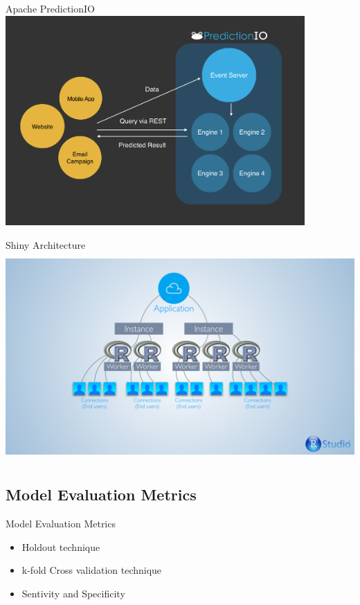 \documentclass{beamer}
\begin{document}
\begin{frame}{Apache PredictionIO}
	\includegraphics[width=\textwidth,height=8cm]{ppt_figures/predictionioeventsever.png}
\end{frame}

\begin{frame}{Shiny Architecture}
	\includegraphics[width=\textwidth,height=8cm]{ppt_figures/shinyscaling.png}
	\end{frame}
	
	
\subsection{Model Evaluation Metrics}
\begin{frame}{Model Evaluation Metrics}
	\begin{itemize}
		\item Holdout technique
		\item k-fold Cross validation technique
		\item Sentivity and Specificity
	\end{itemize}
\end{frame}
\end{document}
